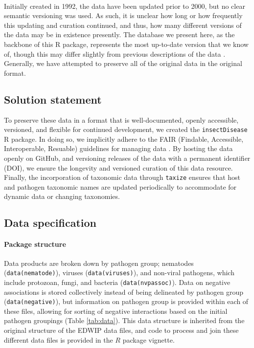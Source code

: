 \documentclass[12pt]{article}
\begin{document}
\paragraph*{}
Initially created in 1992, the data have been updated prior to 2000, but no clear semantic versioning was used. As such, it is unclear how long or how frequently this updating and curation continued, and thus, how many different versions of the data may be in existence presently. The database we present here, as the backbone of this R package, represents the most up-to-date version that we know of, though this may differ slightly from previous descriptions of the data \citep{braxton2003}. Generally, we have attempted to preserve all of the original data in the original format.




\subsection*{Solution statement}
To preserve these data in a format that is well-documented, openly accessible, versioned, and flexible for continued development, we created the \texttt{insectDisease} R package. In doing so, we implicitly adhere to the FAIR (Findable, Accessible, Interoperable, Resuable) guidelines for managing data \citep{wilkinson2016}. By hosting the data openly on GitHub, and versioning releases of the data with a permanent identifier (DOI), we ensure the longevity and versioned curation of this data resource. Finally, the incorporation of taxonomic data through \texttt{taxize} \citep{chamberlain2013} ensures that host and pathogen taxonomic names are updated periodically to accommodate for dynamic data or changing taxonomies. 





\subsection*{Data specification}

\paragraph*{Package structure}
Data products are broken down by pathogen group; nematodes (\texttt{data(nematode)}), viruses (\texttt{data(viruses)}), and non-viral pathogens, which include protozoan, fungi, and bacteria (\texttt{data(nvpassoc)}). Data on negative associations is stored collectively instead of being delineated by pathogen group (\texttt{data(negative)}), but information on pathogen group is provided within each of these files, allowing for sorting of negative interactions based on the initial pathogen groupings (Table \ref{tab:data}). This data structure is inherited from the original structure of the EDWIP data files, and code to process and join these different data files is provided in the $R$ package vignette. 
\end{document}
